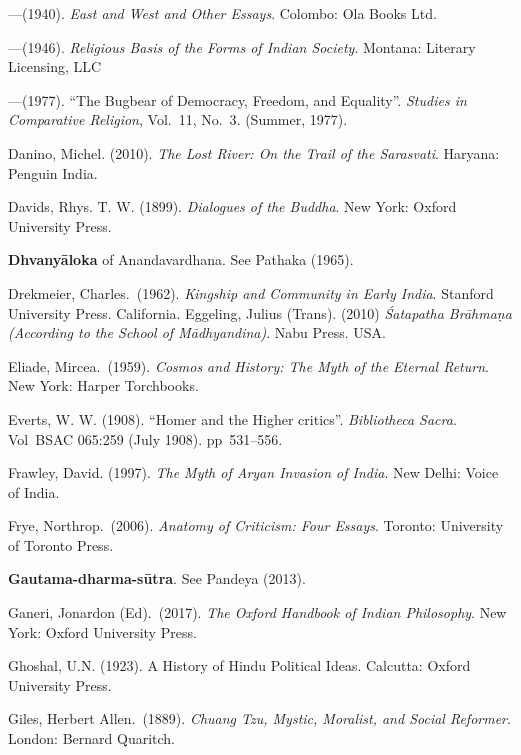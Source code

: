 \begin{thebibliography}{99}
---\kern3pt(1940). {\sl East and West and Other Essays}. Colombo: Ola Books Ltd. 

---\kern3pt(1946). {\sl Religious Basis of the Forms of Indian Society}. Montana: Literary Licensing, LLC

---\kern3pt(1977). “The Bugbear of Democracy, Freedom, and Equality”. {\sl Studies in Comparative Religion}, Vol.~11, No.~3. (Summer, 1977). 

Danino, Michel. (2010). {\sl The Lost River: On the Trail of the Sarasvati}. Haryana: Penguin India.  

Davids, Rhys. T. W. (1899). {\sl Dialogues of the Buddha}. New York: Oxford University Press. 

{\bf Dhvanyāloka} of Anandavardhana. See Pathaka (1965).

Drekmeier, Charles.\ (1962). {\sl Kingship and Community in Early India}. Stanford University Press. California. Eggeling, Julius (Trans). (2010) {\sl Śatapatha Brāhmaṇa (According to the School of Mādhyandina)}. Nabu Press. USA. 

Eliade, Mircea.\ (1959). {\sl Cosmos and History: The Myth of the Eternal Return}. New York: Harper Torchbooks. 

Everts, W. W. (1908). “Homer and the Higher critics”. {\sl Bibliotheca Sacra}. Vol BSAC 065:259 (July 1908). pp~531--556. 

Frawley, David. (1997). {\sl The Myth of Aryan Invasion of India}.  New Delhi: Voice of India. 

Frye, Northrop.\ (2006). {\sl Anatomy of Criticism: Four Essays}. Toronto: University of Toronto Press. 

{\bf Gautama-dharma-sūtra}. See Pandeya (2013). 

Ganeri, Jonardon (Ed).\ (2017). {\sl The Oxford Handbook of Indian Philosophy}. New York: Oxford University Press. 

Ghoshal, U.N. (1923). A History of Hindu Political Ideas. Calcutta: Oxford University Press. 

Giles, Herbert Allen.\ (1889). {\sl Chuang Tzu, Mystic, Moralist, and Social Reformer}. London: Bernard Quaritch. 


\end{thebibliography}
